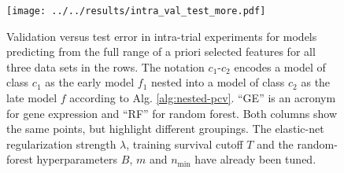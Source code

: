 \begin{figure}
    \centering
    \texttt{[image: ../../results/intra\_val\_test\_more.pdf]}
    \caption{Validation versus test error in intra-trial experiments for models predicting from the 
        full range of a priori selected features for all three data sets in the rows. The notation 
        $c_1$-$c_2$ encodes a model of class $c_1$ as the early model $f_1$ nested into a model of 
        class $c_2$ as the late model $f$ according to Alg. \ref{alg:nested-pcv}.
        ``GE'' is an acronym for gene expression and ``RF'' for random forest. Both columns show 
        the same points, but highlight different groupings. The elastic-net 
        regularization strength $\lambda$, training survival cutoff $T$ and the random-forest 
        hyperparameters $B$, $m$ and $n_\text{min}$ have already been tuned.}
    \label{fig:intra-val-test-more}
\end{figure}
